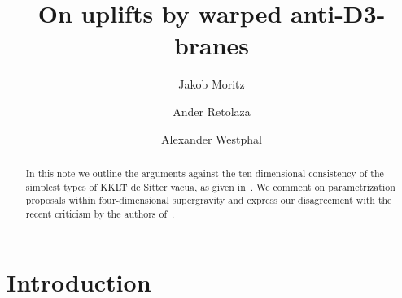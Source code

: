 \documentclass[aps,prd,amsmath,amsfonts,a4paper,11pt,reprint,twocolumn,square,numbers,showpacs,superscriptaddress,floatfix,sort&compress,nofootinbib]{revtex4-1}
\begin{document}
\begin{center}
\vskip -3cm
\end{center}

	\title{On uplifts by warped anti-D3-branes}

	\author{Jakob Moritz}
	\author{Ander Retolaza}
	\author{Alexander Westphal}


			
	\begin{abstract}
		
	In this note we outline the arguments against the ten-dimensional consistency of the simplest types of KKLT de Sitter vacua, as given in~\cite{Moritz:2017xto}. We comment on parametrization proposals within four-dimensional supergravity and express our disagreement with the recent criticism by the authors of~\cite{Kallosh:2018wme}.
		
		
		
		
		
		
	

	\end{abstract}
	
	\maketitle



 	\section{Introduction}
\label{intro}

\end{document}
